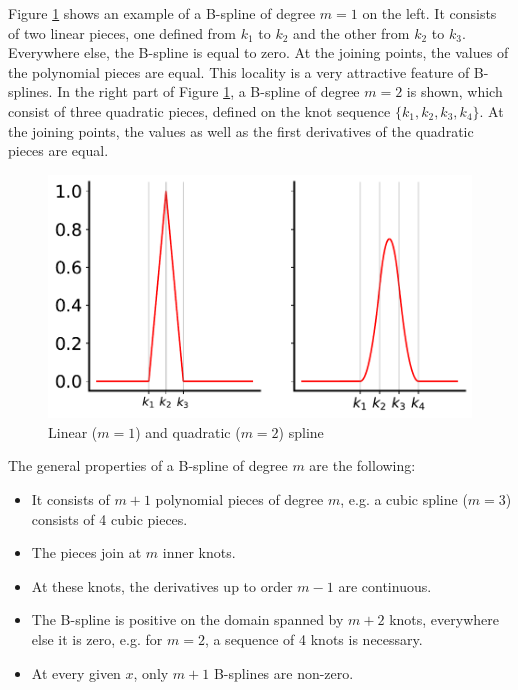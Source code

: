 \documentclass[10pt,a4paper]{report}
\begin{document}
Figure \ref{fig:lin_and_quad_spline} shows an example of a B-spline of degree $m=1$ on the left. It consists of two linear pieces, one defined from $k_1$ to $k_2$ and the other from $k_2$ to $k_3$. Everywhere else, the B-spline is equal to zero. At the joining points, the values of the polynomial pieces are equal. This locality is a very attractive feature of B-splines. In the right part of Figure \ref{fig:lin_and_quad_spline}, a B-spline of degree $m=2$ is shown, which consist of three quadratic pieces, defined on the knot sequence $\{k_1, k_2, k_3, k_4\}$. At the joining points, the values as well as the first derivatives of the quadratic pieces are equal. 

\begin{figure}[H] 
	\centering
	\includegraphics[width=\columnwidth]{../thesisplots/linear_and_quadratic_spline.pdf}
	\caption{Linear ($m=1$) and quadratic ($m=2$) spline}
	\label{fig:lin_and_quad_spline}
\end{figure}

The general properties of a B-spline of degree $m$ are the following:

\begin{itemize}
	\item It consists of $m+1$ polynomial pieces of degree $m$, e.g. a cubic spline ($m=3$) consists of 4 cubic pieces.
	\item The pieces join at $m$ inner knots.
	\item At these knots, the derivatives up to order $m-1$ are continuous.
	\item The B-spline is positive on the domain spanned by $m+2$ knots, everywhere else it is zero, e.g. for $m=2$, a sequence of 4 knots is necessary.
	\item At every given $x$, only $m+1$ B-splines are non-zero.
\end{itemize}
\end{document}
